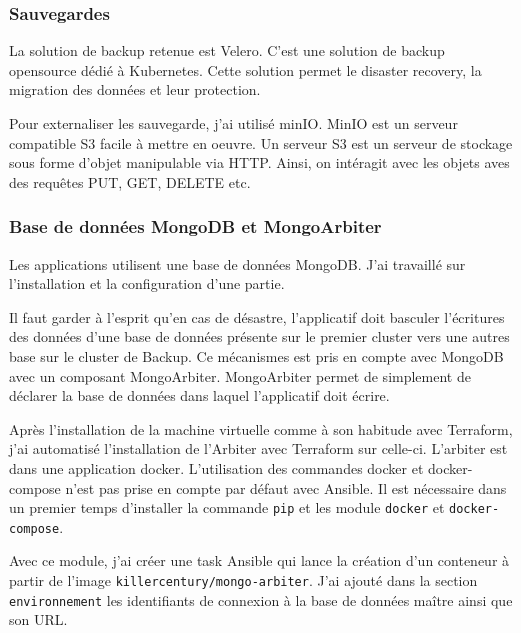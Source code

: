 \documentclass[12pt, a4paper, twoside]{article}
\begin{document}
\subsubsection{Sauvegardes}
La solution de backup retenue est Velero.
C'est une solution de backup opensource dédié à \gls{Kubernetes}.
Cette solution permet le disaster recovery, la migration des données et leur protection.

Pour externaliser les sauvegarde, j'ai utilisé minIO.
MinIO est un serveur compatible S3 facile à mettre en oeuvre.
Un serveur S3 est un serveur de stockage sous forme d'objet manipulable via HTTP.
Ainsi, on intéragit avec les objets aves des requêtes PUT, GET, DELETE etc.

\subsubsection{Base de données MongoDB et MongoArbiter}
Les applications utilisent une base de données MongoDB.
J'ai travaillé sur l'installation et la configuration d'une partie.

Il faut garder à l'esprit qu'en cas de désastre, l'applicatif doit basculer l'écritures des données d'une base de données présente sur le premier \gls{cluster} vers une autres base sur le \gls{cluster} de Backup.
Ce mécanismes est pris en compte avec MongoDB avec un composant MongoArbiter.
MongoArbiter permet de simplement de déclarer la base de données dans laquel l'applicatif doit écrire.

Après l'installation de la machine virtuelle comme à son habitude avec \gls{Terraform}, j'ai automatisé l'installation de l'Arbiter avec \gls{Terraform} sur celle-ci.
L'arbiter est dans une application docker.
L'utilisation des commandes docker et docker-compose n'est pas prise en compte par défaut avec \gls{Ansible}.
Il est nécessaire dans un premier temps d'installer la commande \verb|pip| et les module \verb|docker| et \verb|docker-compose|.

Avec ce module, j'ai créer une task \gls{Ansible} qui lance la création d'un conteneur à partir de l'image \verb|killercentury/mongo-arbiter|.
J'ai ajouté dans la section \verb|environnement| les identifiants de connexion à la base de données maître ainsi que son URL.

\newpage
\end{document}
